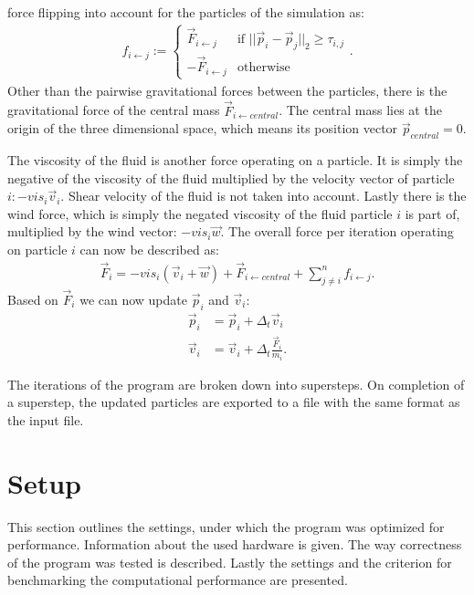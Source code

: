 \documentclass[twoside,11pt]{article}
\begin{document}
force flipping into account for the particles of the simulation as:
\begin{align}
  \label{eq:f}
  f_{i \leftarrow j} := \begin{cases}
    \vec{F}_{i \leftarrow j} &\text{if }
      ||\vec{p}_i - \vec{p}_j||_2 \ge \tau_{i,j} \\
    -\vec{F}_{i \leftarrow j} &\text{otherwise}
  \end{cases}.
\end{align}
Other than the pairwise gravitational forces between the particles,
there is the gravitational force of the central mass
$\vec{F}_{i \leftarrow central}$.
The central mass lies at the origin of the three dimensional space,
which means its position vector $\vec{p}_{central} = 0$.

The viscosity of the fluid is another force operating on a particle.
It is simply the negative of the viscosity of the fluid multiplied
by the velocity vector of particle $i: -vis_i \vec{v}_i$.
Shear velocity of the fluid is not taken into account.
Lastly there is the wind force, which is simply the negated viscosity
of the fluid particle $i$ is part of, multiplied by the wind vector:
$-vis_i \vec{w}$.
The overall force per iteration operating on particle $i$ can now
be described as:
\begin{align}
  \label{eq:F_all}
  \vec{F}_i = -vis_i(\vec{v}_i + \vec{w}) +
              \vec{F}_{i \leftarrow central} +
              \sum_{j\neq i}^n f_{i \leftarrow j}.
\end{align}
Based on $\vec{F}_i$ we can now update $\vec{p}_i$ and $\vec{v}_i$:
\begin{align}
  \label{eq:p}
  \vec{p}_i &= \vec{p}_i + \Delta_t \vec{v}_i \\
  \label{eq:v}
  \vec{v}_i &= \vec{v}_i + \Delta_t \frac{\vec{F}_i}{m_i}.
\end{align}

The iterations of the program are broken down into supersteps.
On completion of a superstep, the updated particles are exported to a
file with the same format as the input file.


\section{Setup} %
\label{sec:setup}

This section outlines the settings, under which the program was
optimized for performance. Information about the used hardware is
given.
The way correctness of the program was tested is described.
Lastly the settings and the criterion for benchmarking the
computational performance are presented.
\end{document}
